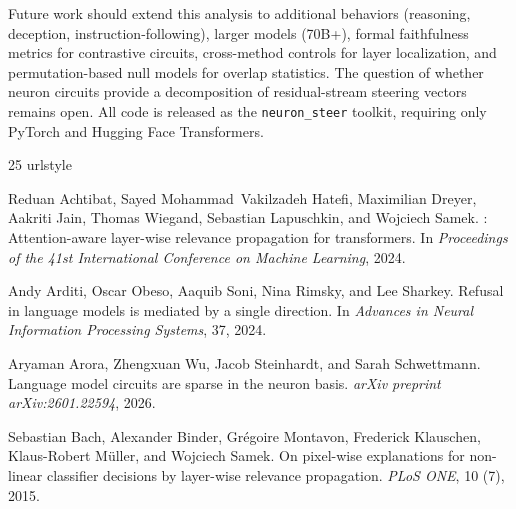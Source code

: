 \documentclass[11pt]{article}
\begin{document}
Future work should extend this analysis to additional behaviors (reasoning, deception, instruction-following), larger models (70B+), formal faithfulness metrics for contrastive circuits, cross-method controls for layer localization, and permutation-based null models for overlap statistics.
The question of whether neuron circuits provide a decomposition of residual-stream steering vectors remains open.
All code is released as the \texttt{neuron\_steer} toolkit, requiring only PyTorch and Hugging Face Transformers.



\begin{thebibliography}{25}
\providecommand{\natexlab}[1]{#1}
\providecommand{\url}[1]{\texttt{#1}}
\expandafter\ifx\csname urlstyle\endcsname\relax
  \providecommand{\doi}[1]{doi: #1}\else
  \providecommand{\doi}{doi: \begingroup \urlstyle{rm}\Url}\fi

Reduan Achtibat, Sayed Mohammad~Vakilzadeh Hatefi, Maximilian Dreyer, Aakriti
  Jain, Thomas Wiegand, Sebastian Lapuschkin, and Wojciech Samek.
: Attention-aware layer-wise relevance propagation for
  transformers.
\newblock In \emph{Proceedings of the 41st International Conference on Machine
  Learning}, 2024.

Andy Arditi, Oscar Obeso, Aaquib Soni, Nina Rimsky, and Lee Sharkey.
\newblock Refusal in language models is mediated by a single direction.
\newblock In \emph{Advances in Neural Information Processing Systems}, 37, 2024.

Aryaman Arora, Zhengxuan Wu, Jacob Steinhardt, and Sarah Schwettmann.
\newblock Language model circuits are sparse in the neuron basis.
\newblock \emph{arXiv preprint arXiv:2601.22594}, 2026.

Sebastian Bach, Alexander Binder, Gr{\'e}goire Montavon, Frederick Klauschen,
  Klaus-Robert M{\"u}ller, and Wojciech Samek.
\newblock On pixel-wise explanations for non-linear classifier decisions by
  layer-wise relevance propagation.
\newblock \emph{PLoS ONE}, 10 (7), 2015.


\end{thebibliography}
\end{document}
